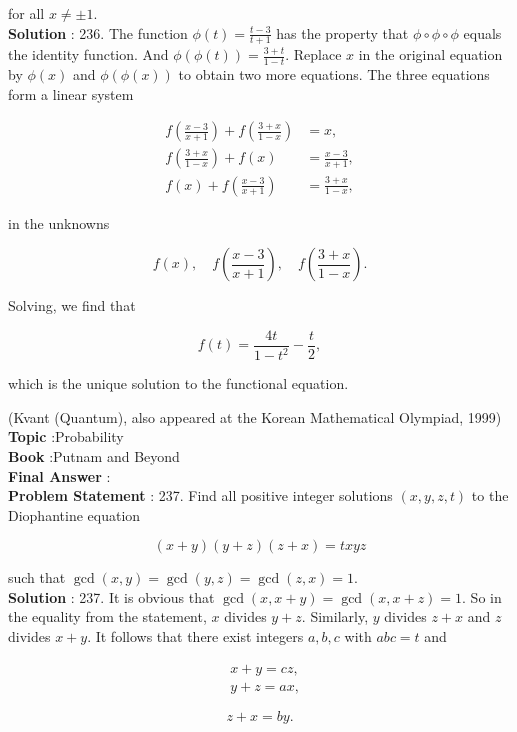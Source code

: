 \documentclass[10pt]{article}
\begin{document}
for all $x \neq \pm 1$.
\\
\textbf{Solution} :
236. The function $\phi(t)=\frac{t-3}{t+1}$ has the property that $\phi \circ \phi \circ \phi$ equals the identity function. And $\phi(\phi(t))=\frac{3+t}{1-t}$. Replace $x$ in the original equation by $\phi(x)$ and $\phi(\phi(x))$ to obtain two more equations. The three equations form a linear system

$$
\begin{aligned}
f\left(\frac{x-3}{x+1}\right)+f\left(\frac{3+x}{1-x}\right) &=x, \\
f\left(\frac{3+x}{1-x}\right)+f(x) &=\frac{x-3}{x+1}, \\
f(x)+f\left(\frac{x-3}{x+1}\right) &=\frac{3+x}{1-x},
\end{aligned}
$$

in the unknowns

$$
f(x), \quad f\left(\frac{x-3}{x+1}\right), \quad f\left(\frac{3+x}{1-x}\right) .
$$

Solving, we find that

$$
f(t)=\frac{4 t}{1-t^{2}}-\frac{t}{2},
$$

which is the unique solution to the functional equation.

(Kvant (Quantum), also appeared at the Korean Mathematical Olympiad, 1999)
\\
\textbf{Topic} :Probability\\
\textbf{Book} :Putnam and Beyond\\
\textbf{Final Answer} :\\


\textbf{Problem Statement} :
237. Find all positive integer solutions $(x, y, z, t)$ to the Diophantine equation

$$
(x+y)(y+z)(z+x)=t x y z
$$

such that $\operatorname{gcd}(x, y)=\operatorname{gcd}(y, z)=\operatorname{gcd}(z, x)=1$.
\\
\textbf{Solution} :
237. It is obvious that $\operatorname{gcd}(x, x+y)=\operatorname{gcd}(x, x+z)=1$. So in the equality from the statement, $x$ divides $y+z$. Similarly, $y$ divides $z+x$ and $z$ divides $x+y$. It follows that there exist integers $a, b, c$ with $a b c=t$ and

$$
\begin{aligned}
&x+y=c z, \\
&y+z=a x,
\end{aligned}
$$



$$
z+x=b y .
$$
\end{document}
